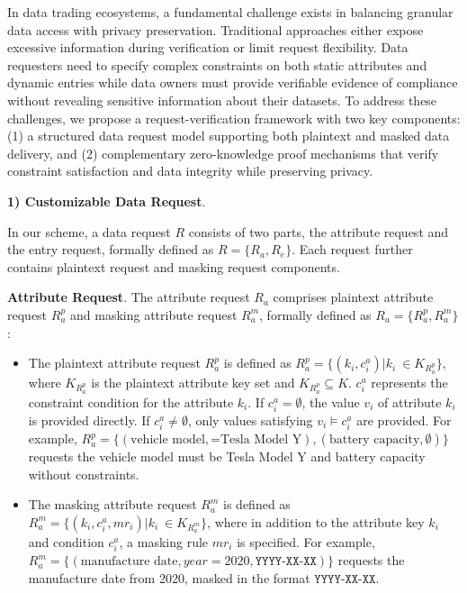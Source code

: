 \documentclass[journal]{IEEEtran}
\begin{document}
In data trading ecosystems, a fundamental challenge exists in balancing granular data access with privacy preservation. Traditional approaches either expose excessive information during verification or limit request flexibility. Data requesters need to specify complex constraints on both static attributes and dynamic entries while data owners must provide verifiable evidence of compliance without revealing sensitive information about their datasets. To address these challenges, we propose a  request-verification framework with two key components: (1) a structured data request model supporting both plaintext and masked data delivery, and (2) complementary zero-knowledge proof mechanisms that verify constraint satisfaction and data integrity while preserving privacy.

\textbf{1) Customizable Data Request}.

In our scheme, a data request $R$ consists of two parts, the attribute request and the entry request, formally defined as $R=\{R_a,R_e\}$. Each request further contains plaintext request and masking request components.

\textbf{Attribute Request}. The attribute request $R_a$ comprises plaintext attribute request $R_a^p$ and masking attribute request $R_a^m$, formally defined as $R_a = \{R_a^p,R_a^m\}$:

\begin{itemize}
    \item The plaintext attribute request $R_a^p$ is defined as $R_a^p=\{(k_i,c_i^a) | k_{i}\ \in K_{R_{a}^{p}}\}$, where $K_{R_{a}^{p}}$ is the plaintext attribute key set and $K_{R_{a}^{p}} \subseteq K$. $c_i^a$ represents the constraint condition for the attribute $k_i$. If $c_i^a =\emptyset$, the value $v_i$ of attribute $k_i$ is provided directly. If $c_{i}^a\neq \emptyset$, only values satisfying $v_{i}\models c_{i}^a$ are provided. For example, $R_a^p=\{(\text{vehicle model},\text{=Tesla Model Y}), (\text{battery capacity},\emptyset)\}$ requests the vehicle model must be Tesla Model Y and battery capacity without constraints.
    \item The masking attribute request $R_a^m$ is defined as $R_a^m=\{(k_{i},c_{i}^a,mr_{i})| k_{i}\ \in K_{R_{a}^{m}}\}$, where in addition to the attribute key $k_i$ and condition $c_i^a$, a masking rule $mr_i$ is specified. For example, $R_a^m=\{(\text{manufacture date}, year=2020, \texttt{YYYY-XX-XX})\}$ requests the manufacture date from 2020, masked in the format $\texttt{YYYY-XX-XX}$.
\end{itemize}
\end{document}
